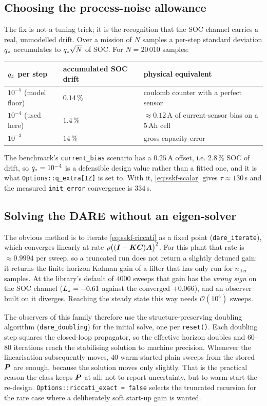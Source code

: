 \subsection{Choosing the process-noise allowance}
\label{sec:sskf-q}
The fix is not a tuning trick; it is the recognition that the SOC channel carries a real,
unmodelled drift.  Over a mission of $N$ samples a per-step standard deviation $q_{z}$
accumulates to $q_{z}\sqrt{N}$ of SOC.  For $N = 20\,010$ samples:
\begin{center}
\begin{tabular}{@{}lll@{}}
\toprule
$q_{z}$ per step & accumulated SOC drift & physical equivalent \\
\midrule
$10^{-5}$ (model floor) & $0.14\,\%$ & coulomb counter with a perfect sensor \\
$10^{-4}$ (used here)   & $1.4\,\%$  & $\approx 0.12$\,A of current-sensor bias on a 5\,Ah cell \\
$10^{-3}$               & $14\,\%$   & gross capacity error \\
\bottomrule
\end{tabular}
\end{center}
The benchmark's \texttt{current\_bias} scenario has a $0.25$\,A offset, i.e. $2.8\,\%$ SOC of
drift, so $q_{z}=10^{-4}$ is a defensible design value rather than a fitted one, and it is
what \texttt{Options::q\_extra[IZ]} is set to.  With it, \eqref{eq:sskf-scalar} gives
$\tau\approx 130$\,s and the measured \texttt{init\_error} convergence is $334$\,s.

\subsection{Solving the DARE without an eigen-solver}
The obvious method is to iterate \eqref{eq:sskf-riccati} as a fixed point
(\texttt{dare\_iterate}), which converges linearly at rate $\rho\big((\bm{I}-\bm{K}\bm{C})\bm{A}\big)^2$.  For
this plant that rate is $\approx 0.9994$ per sweep, so a truncated run does not return a slightly
detuned gain: it returns the finite-horizon Kalman gain of a filter that has only run for
$n_{\mathrm{iter}}$ samples.  At the library's default of $4000$ sweeps that gain has the
\emph{wrong sign} on the SOC channel ($L_{z}=-0.61$ against the converged $+0.066$), and an
observer built on it diverges.  Reaching the steady state this way needs $\mathcal{O}(10^4)$
sweeps.

The observers of this family therefore use the structure-preserving doubling algorithm
(\texttt{dare\_doubling}) for the initial solve, one per \texttt{reset()}.  Each doubling step
squares the closed-loop propagator, so the effective horizon doubles and $60$--$80$ iterations
reach the stabilising solution to machine precision.  Whenever the linearisation subsequently
moves, $40$ warm-started plain sweeps from the stored $\bm{P}$ are enough, because the solution
moves only slightly.  That is the practical reason the class keeps $\bm{P}$ at all: not to report
uncertainty, but to warm-start the re-design.  \texttt{Options::riccati\_exact = false} selects
the truncated recursion for the rare case where a deliberately soft start-up gain is wanted.

